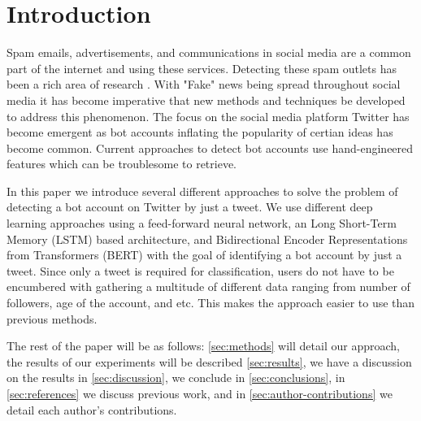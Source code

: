 \section{Introduction}
\label{sec:introduction}

Spam emails, advertisements, and communications in social media are a
common part of the internet and using these services. Detecting these
spam outlets has been a rich area of research
\citep{Cormack:2008:ESF:1454707.1454708,
DBLP:journals/corr/cs-CL-0009009, Androutsopoulos2006LearningTF,
Bickel:2006:DSF:2976456.2976477, Bratko:2006:SFU:1248547.1248644,
Solan:inproceedings, Cresci:2017:PSS:3041021.3055135, fameforsale2015,
INUWADUTSE2018496, FM2793, 8424744}.  With "Fake" news being spread
throughout social media \citep{NBERw25223} it has become imperative
that new methods and techniques be developed to address this
phenomenon. The focus on the social media platform Twitter has become
emergent \citep{8424744, FM2793, INUWADUTSE2018496,
Cresci:2017:PSS:3041021.3055135, fameforsale2015} as bot accounts
inflating the popularity of certian ideas has become common. Current
approaches to detect bot accounts use hand-engineered features which
can be troublesome to retrieve.

In this paper we introduce several different approaches to solve the
problem of detecting a bot account on Twitter by just a tweet. We use
different deep learning approaches using a feed-forward neural
network, an Long Short-Term Memory (LSTM) based architecture, and
Bidirectional Encoder Representations from Transformers (BERT) with
the goal of identifying a bot account by just a tweet. Since only a
tweet is required for classification, users do not have to be
encumbered with gathering a multitude of different data ranging from
number of followers, age of the account, and etc. This makes the
approach easier to use than previous methods.

The rest of the paper will be as follows: \cref{sec:methods} will
detail our approach, the results of our experiments will be described
\cref{sec:results}, we have a discussion on the results in \cref{sec:discussion}, we conclude in \cref{sec:conclusions}, in
\cref{sec:references} we discuss previous work, and in
\cref{sec:author-contributions} we detail each author's contributions.
